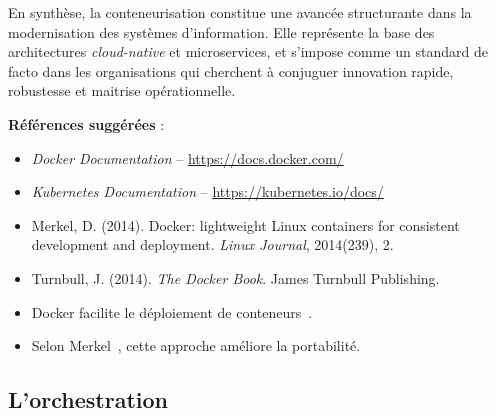 En synthèse, la conteneurisation constitue une avancée structurante dans la modernisation des systèmes d’information. Elle représente la base des architectures \textit{cloud-native} et microservices, et s’impose comme un standard de facto dans les organisations qui cherchent à conjuguer innovation rapide, robustesse et maitrise opérationnelle.

\textbf{Références suggérées} :
\begin{itemize}
	\item \textit{Docker Documentation} – \url{https://docs.docker.com/}
	\item \textit{Kubernetes Documentation} – \url{https://kubernetes.io/docs/}
	\item Merkel, D. (2014). Docker: lightweight Linux containers for consistent development and deployment. \textit{Linux Journal}, 2014(239), 2.
	\item Turnbull, J. (2014). \textit{The Docker Book}. James Turnbull Publishing.
	\item Docker facilite le déploiement de conteneurs~\cite{docker-docs}.
	\item Selon Merkel~\cite{merkel2014docker}, cette approche améliore la portabilité.
\end{itemize}

\subsection{L’orchestration}

